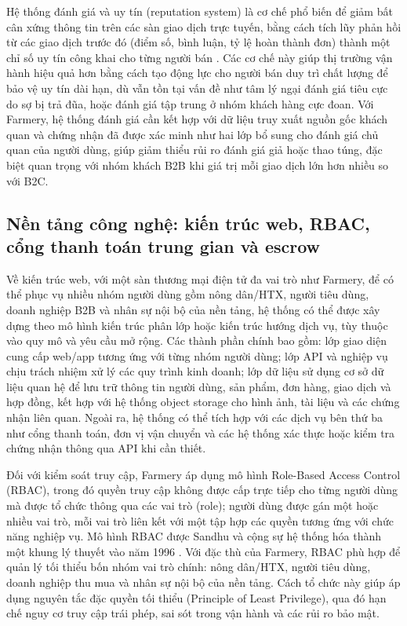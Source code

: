 Hệ thống đánh giá và uy tín (reputation system) là cơ chế phổ biến để giảm bất cân xứng thông tin trên các sàn giao dịch trực tuyến, bằng cách tích lũy phản hồi từ các giao dịch trước đó (điểm số, bình luận, tỷ lệ hoàn thành đơn) thành một chỉ số uy tín công khai cho từng người bán \parencite{springer_article}. Các cơ chế này giúp thị trường vận hành hiệu quả hơn bằng cách tạo động lực cho người bán duy trì chất lượng để bảo vệ uy tín dài hạn, dù vẫn tồn tại vấn đề như tâm lý ngại đánh giá tiêu cực do sợ bị trả đũa, hoặc đánh giá tập trung ở nhóm khách hàng cực đoan. Với Farmery, hệ thống đánh giá cần kết hợp với dữ liệu truy xuất nguồn gốc khách quan và chứng nhận đã được xác minh như hai lớp bổ sung cho đánh giá chủ quan của người dùng, giúp giảm thiểu rủi ro đánh giá giả hoặc thao túng, đặc biệt quan trọng với nhóm khách B2B khi giá trị mỗi giao dịch lớn hơn nhiều so với B2C.

\subsection{Nền tảng công nghệ: kiến trúc web, RBAC, cổng thanh toán trung gian và escrow}

Về kiến trúc web, với một sàn thương mại điện tử đa vai trò như Farmery, để có thể phục vụ nhiều nhóm người dùng gồm nông dân/HTX, người tiêu dùng, doanh nghiệp B2B và nhân sự nội bộ của nền tảng, hệ thống có thể được xây dựng theo mô hình kiến trúc phân lớp hoặc kiến trúc hướng dịch vụ, tùy thuộc vào quy mô và yêu cầu mở rộng. Các thành phần chính bao gồm: lớp giao diện cung cấp web/app tương ứng với từng nhóm người dùng; lớp API và nghiệp vụ chịu trách nhiệm xử lý các quy trình kinh doanh; lớp dữ liệu sử dụng cơ sở dữ liệu quan hệ để lưu trữ thông tin người dùng, sản phẩm, đơn hàng, giao dịch và hợp đồng, kết hợp với hệ thống object storage cho hình ảnh, tài liệu và các chứng nhận liên quan. Ngoài ra, hệ thống có thể tích hợp với các dịch vụ bên thứ ba như cổng thanh toán, đơn vị vận chuyển và các hệ thống xác thực hoặc kiểm tra chứng nhận thông qua API khi cần thiết.

Đối với kiểm soát truy cập, Farmery áp dụng mô hình Role-Based Access Control (RBAC), trong đó quyền truy cập không được cấp trực tiếp cho từng người dùng mà được tổ chức thông qua các vai trò (role); người dùng được gán một hoặc nhiều vai trò, mỗi vai trò liên kết với một tập hợp các quyền tương ứng với chức năng nghiệp vụ. Mô hình RBAC được Sandhu và cộng sự hệ thống hóa thành một khung lý thuyết vào năm 1996 \parencite{sandhu1996rbac}. Với đặc thù của Farmery, RBAC phù hợp để quản lý tối thiểu bốn nhóm vai trò chính: nông dân/HTX, người tiêu dùng, doanh nghiệp thu mua và nhân sự nội bộ của nền tảng. Cách tổ chức này giúp áp dụng nguyên tắc đặc quyền tối thiểu (Principle of Least Privilege), qua đó hạn chế nguy cơ truy cập trái phép, sai sót trong vận hành và các rủi ro bảo mật.


